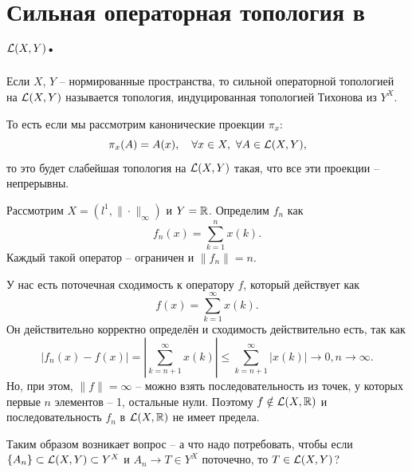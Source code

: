 \section{Сильная операторная топология в $\mathcal{L}(X, Y)$.}
\begin{definition}
    Если $X$, $Y$ -- нормированные пространства, то сильной операторной топологией на $\mathcal{L}(X, Y)$ называется топология, индуцированная топологией Тихонова из $Y^{X}$.

    То есть если мы рассмотрим канонические проекции $\pi_x\colon$
    \[
        \pi_x(A) = A(x), \quad \forall x \in X, \ \forall A \in \LL(X, Y),
    \]
    то это будет слабейшая топология на $\mathcal{L}(X, Y)$ такая, что все эти проекции -- непрерывны.
\end{definition}
\begin{example}
    Рассмотрим $X = (l^1, \|\cdot\|_\infty)$ и $Y = \mathbb{R}$.
    Определим $f_n$ как
    \[
        f_n(x) = \sum_{k = 1}^{n} x(k).
    \]
    Каждый такой оператор -- ограничен и $\|f_n\| = n$.

    У нас есть поточечная сходимость к оператору $f$, который действует как
    \[
        f(x) = \sum_{k = 1}^{\infty} x(k).
    \]
    Он действительно корректно определён и сходимость действительно есть, так как
    \[
        |f_n(x) - f(x)| = \left|\sum_{k = n + 1}^{\infty} x(k)\right| \leq \sum_{k = n + 1}^{\infty} |x(k)| \rightarrow 0, n \rightarrow \infty.
    \]
    Но, при этом, $\|f\| = \infty$ -- можно взять последовательность из точек, у которых первые $n$ элементов -- 1, остальные нули.
    Поэтому $f \notin \mathcal{L}(X, \mathbb{R})$ и последовательность $f_n$ в $\mathcal{L}(X, \mathbb{R})$ не имеет предела.
\end{example}
\begin{question}
    Таким образом возникает вопрос -- а что надо потребовать, чтобы если $\{A_n\} \subset \mathcal{L}(X, Y) \subset Y^X$ и $A_n \rightarrow T \in Y^X$ поточечно, то $T \in \mathcal{L}(X, Y)$?
\end{question}
